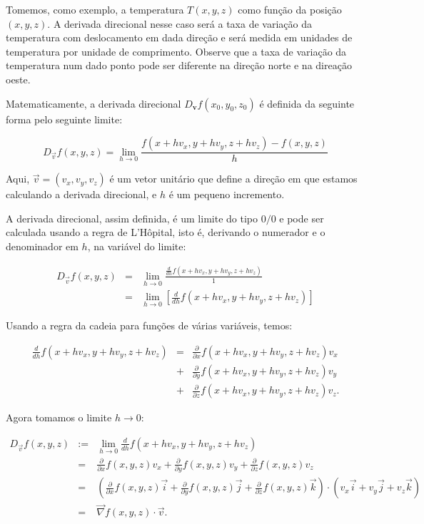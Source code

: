 Tomemos, como exemplo, a temperatura $T(x, y, z)$ como função da posição $(x, y, z)$. A derivada direcional nesse caso será a taxa de variação da temperatura com deslocamento em dada direção e será  medida em unidades de temperatura por unidade de comprimento. Observe que a taxa de variação da temperatura num dado ponto pode ser diferente na direção norte e na direação oeste.

Matematicamente, a derivada direcional \( D_{\mathbf{v}} f(x_0, y_0, z_0) \) é definida da seguinte forma pelo seguinte limite:

$$
D_{\vec{v}} f(x, y, z) = \lim_{{h \to 0}} \frac{f(x + hv_x, y + hv_y, z + hv_z) - f(x, y, z)}{h}
$$

Aqui, \( \vec{v} = (v_x, v_y, v_z) \) é um vetor unitário que define a direção em que estamos calculando a derivada direcional, e \( h \) é um pequeno incremento.

A derivada direcional, assim definida, é um limite do tipo $0/0$ e pode ser calculada usando a regra de L'Hôpital, isto é, derivando o numerador e o denominador em $h$, na variável do limite:

\begin{eqnarray*}
D_{\vec{v}} f(x, y, z) &=& \lim_{{h \to 0}} \frac{\frac{d}{dh}f(x + hv_x, y + hv_y, z + hv_z) }{1}\\
&=&\lim_{{h \to 0}} \left[\frac{d}{dh}f(x + hv_x, y + hv_y, z + hv_z)\right] 
\end{eqnarray*}

Usando a regra da cadeia para funções de várias variáveis, temos:


\begin{eqnarray*}
 \frac{d}{dh} f(x + hv_x, y + hv_y, z + hv_z) 
 &=&  \frac{\partial}{\partial x} f(x + hv_x, y + hv_y, z + hv_z)v_x\\
 &+&\frac{\partial}{\partial y}f(x + hv_x, y + hv_y, z + hv_z)v_y\\
 &+&\frac{\partial}{\partial z}f(x + hv_x, y + hv_y, z + hv_z)v_z .
\end{eqnarray*}

Agora tomamos o limite $h\to 0$:

\begin{eqnarray*}
D_{\vec{v}} f(x, y, z) &:=& \lim_{h \to 0} \frac{d}{dh} f(x + hv_x, y + hv_y, z + hv_z) \\
&=&\frac{\partial}{\partial x} f(x,y,z)v_x + \frac{\partial}{\partial y} f(x,y,z)v_y+ \frac{\partial}{\partial z} f(x,y,z)v_z\\
&=&\left(\frac{\partial}{\partial x} f(x,y,z)\vec{i} + \frac{\partial}{\partial y} f(x,y,z) \vec{j} + \frac{\partial}{\partial z} f(x,y,z)\vec{k}\right)\cdot\left(v_x\vec{i}+v_y\vec{j}+v_z\vec{k} \right)\\
&=&\vec{\nabla}f(x,y,z)\cdot\vec{v}.
\end{eqnarray*}



